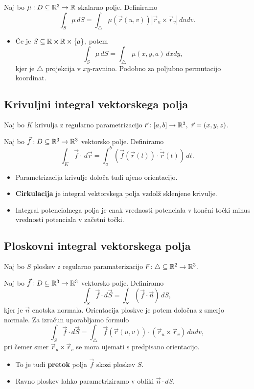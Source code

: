 Naj bo \(\mu: D \subseteq \mathbb{R}^3 \to \mathbb{R}\) skalarno polje. Definiramo 
\[
    \int_{S} \mu \, dS = \int_{\triangle} \mu(\vec{r}(u, v)) |\vec{r}_u \times \vec{r}_v| \, dudv.
\]

\begin{itemize}
    \item Če je \(S \subseteq \mathbb{R} \times \mathbb{R} \times \{a\}\), potem 
    \[
        \int_{S} \mu \, dS = \int_{\triangle} \mu(x,y,a) \, dxdy,
    \]
    kjer je \(\triangle\) projekcija v \(xy\)-ravnino. Podobno za poljubno permutacijo koordinat.
\end{itemize}

\subsection{Krivuljni integral vektorskega polja}
Naj bo \(K\) krivulja z regularno parametrizacijo \(\vec{r}: [a,b] \to \mathbb{R}^3, \ \vec{r} = (x, y, z)\). 

Naj bo \(\vec{f}: D \subseteq \mathbb{R}^3 \to \mathbb{R}^3\) vektorsko polje. Definiramo 
\[
    \int_{K} \vec{f} \cdot \, d\vec{r} = \int_{a}^{b} (\vec{f}(\vec{r}(t)) \cdot \dot{\vec{r}}(t)) \, dt.
\]

\begin{itemize}
    \item Parametrizacija krivulje določa tudi njeno orientacijo.
    \item \textbf{Cirkulacija} je integral vektorskega polja vzdolž sklenjene krivulje.
    \item Integral potencialnega polja je enak vrednosti potenciala v končni točki minus vrednosti potenciala v začetni točki.
\end{itemize}

\subsection{Ploskovni integral vektorskega polja}
Naj bo \(S\) ploskev z regularno paramaterizacijo \(\vec{r}: \triangle \subseteq \mathbb{R}^2 \to \mathbb{R}^3\).

Naj bo \(\vec{f}: D \subseteq \mathbb{R}^3 \to \mathbb{R}^3\) vektorsko polje. Definiramo
\[
    \int_{S} \vec{f} \cdot d \vec{S} = \int_{S} (\vec{f} \cdot \vec{n})\, dS,
\]
kjer je \(\vec{n}\) enotska normala. Orientacija ploskve je potem določna z smerjo normale. Za izračun uporabljamo formulo
\[
    \int_{S} \vec{f} \cdot d \vec{S} = \int_{\triangle} \vec{f}(\vec{r}(u, v)) \cdot (\vec{r}_u \times \vec{r}_v) \, dudv,
\]
pri čemer smer \(\vec{r}_u \times \vec{r}_v\) se mora ujemati s predpisano orientacijo.
\begin{itemize}
    \item To je tudi \textbf{pretok} polja \(\vec{f}\) skozi ploskev \(S\).
    \item Ravno ploskev lahko parametriziramo v obliki \(\vec{n} \cdot dS\).
\end{itemize}

